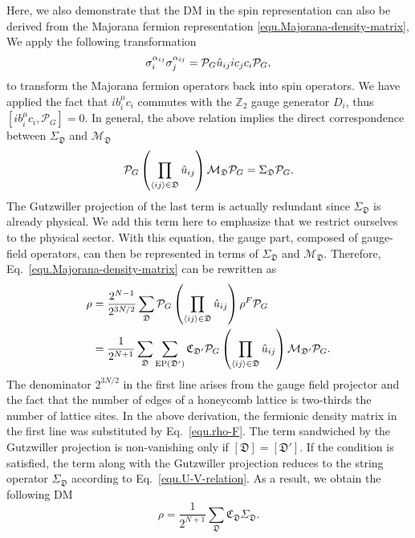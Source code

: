 Here, we also demonstrate that the DM in the spin representation can also be derived from the Majorana fermion representation \eqref{equ.Majorana-density-matrix}, We apply the following transformation
\[
\sigma^{\alpha_{i j}}_{i}\sigma^{\alpha_{i j}}_{j} = \mathcal{P}_G \hat{u}_{ij}ic_jc_i \mathcal{P}_G,
\]
to transform the Majorana fermion operators back into spin operators. We have applied the fact that $ib^\mu_ic_i$ commutes with the $\mathbb{Z}_2$ gauge generator $D_i$, thus $[ib^\mu_i c_i, \mathcal{P}_G]=0$. In general, the above relation implies the direct correspondence between $\Sigma_\mathfrak{D}$ and $\mathcal{M}_\mathfrak{D}$
\begin{equation}\label{equ.U-V-relation} 
    \mathcal{P}_G \left( \prod_{\left\langle ij \right\rangle\in\mathfrak{D}}\hat{u}_{ij} \right) \mathcal{M}_\mathfrak{D} \mathcal{P}_G 
    = 
    \Sigma_{\mathfrak{D}}\mathcal{P}_G.
\end{equation}
The Gutzwiller projection of the last term is actually redundant since $\Sigma_{\mathfrak{D}}$ is already physical. We add this term here to emphasize that we restrict ourselves to the physical sector. With this equation, the gauge part, composed of gauge-field operators, can then be represented in terms of $\Sigma_\mathfrak{D}$ and $\mathcal{M}_\mathfrak{D}$. Therefore, Eq.~\eqref{equ.Majorana-density-matrix} can be rewritten as
\begin{align*}
    \rho &= \frac{2^{N-1}}{2^{3N/2}} \sum_{\mathfrak{D}} 
    \mathcal{P}_G \left( \prod_{\left\langle ij \right\rangle\in\mathfrak{D}} \hat{u}_{ij} \right) 
    \rho^F 
    \mathcal{P}_G \\
    &=\frac{1}{2^{N+1}} \sum_{\mathfrak{D}} 
    \sum_{\mathrm{EP}(\mathfrak{D}')} \mathfrak{C}_{\mathfrak{D}'}
    \mathcal{P}_G \left( \prod_{\left\langle ij \right\rangle\in\mathfrak{D}} \hat{u}_{ij} \right) \mathcal{M}_{\mathfrak{D}'} \mathcal{P}_G
    .
\end{align*}
The denominator $2^{3N/2}$ in the first line arises from the gauge field projector and the fact that the number of edges of a honeycomb lattice is two-thirds the number of lattice sites. In the above derivation, the fermionic density matrix in the first line was substituted by Eq.~\eqref{equ.rho-F}. The term sandwiched by the Gutzwiller projection is non-vanishing only if $[\mathfrak{D}] = [\mathfrak{D}']$. If the condition is satisfied, the term along with the Gutzwiller projection reduces to the string operator $\Sigma_{\mathfrak{D}}$ according to Eq.~\eqref{equ.U-V-relation}. As a result, we obtain the following DM
\begin{equation}\label{equ.spin-rho-from-fermion}
    \rho = \frac{1}{2^{N+1}} \sum_{\mathfrak{D}} \mathfrak{C}_\mathfrak{D} \Sigma_\mathfrak{D}. 
\end{equation}
